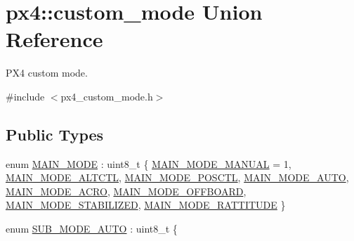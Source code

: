 \hypertarget{unionpx4_1_1custom__mode}{}\section{px4\+::custom\+\_\+mode Union Reference}
\label{unionpx4_1_1custom__mode}


P\+X4 custom mode.  




{\ttfamily \#include $<$px4\+\_\+custom\+\_\+mode.\+h$>$}

\subsection*{Public Types}
\begin{DoxyCompactItemize}
\item 
enum \mbox{\hyperlink{unionpx4_1_1custom__mode_ad9d2a8e78d275f102f16fa30fd46bc82}{M\+A\+I\+N\+\_\+\+M\+O\+DE}} \+: uint8\+\_\+t \{ \newline
\mbox{\hyperlink{unionpx4_1_1custom__mode_ad9d2a8e78d275f102f16fa30fd46bc82a859877541f02ff75c660f1f9ab05ade0}{M\+A\+I\+N\+\_\+\+M\+O\+D\+E\+\_\+\+M\+A\+N\+U\+AL}} = 1, 
\mbox{\hyperlink{unionpx4_1_1custom__mode_ad9d2a8e78d275f102f16fa30fd46bc82a86efb118ff5224cdabe493767f2256dc}{M\+A\+I\+N\+\_\+\+M\+O\+D\+E\+\_\+\+A\+L\+T\+C\+TL}}, 
\mbox{\hyperlink{unionpx4_1_1custom__mode_ad9d2a8e78d275f102f16fa30fd46bc82a1e95a007c4fd63a63a393970223747cd}{M\+A\+I\+N\+\_\+\+M\+O\+D\+E\+\_\+\+P\+O\+S\+C\+TL}}, 
\mbox{\hyperlink{unionpx4_1_1custom__mode_ad9d2a8e78d275f102f16fa30fd46bc82aff2049d1f4a5e0a01add3681c27986a0}{M\+A\+I\+N\+\_\+\+M\+O\+D\+E\+\_\+\+A\+U\+TO}}, 
\newline
\mbox{\hyperlink{unionpx4_1_1custom__mode_ad9d2a8e78d275f102f16fa30fd46bc82a7506d3ca132ad236dec8942e638a7336}{M\+A\+I\+N\+\_\+\+M\+O\+D\+E\+\_\+\+A\+C\+RO}}, 
\mbox{\hyperlink{unionpx4_1_1custom__mode_ad9d2a8e78d275f102f16fa30fd46bc82af4a0491cd9ec75832d350e1925c8992c}{M\+A\+I\+N\+\_\+\+M\+O\+D\+E\+\_\+\+O\+F\+F\+B\+O\+A\+RD}}, 
\mbox{\hyperlink{unionpx4_1_1custom__mode_ad9d2a8e78d275f102f16fa30fd46bc82a4b8b7be9d26f575a78a0eb8d890a9881}{M\+A\+I\+N\+\_\+\+M\+O\+D\+E\+\_\+\+S\+T\+A\+B\+I\+L\+I\+Z\+ED}}, 
\mbox{\hyperlink{unionpx4_1_1custom__mode_ad9d2a8e78d275f102f16fa30fd46bc82a76c02bf5d821b9ffc39471477d021da4}{M\+A\+I\+N\+\_\+\+M\+O\+D\+E\+\_\+\+R\+A\+T\+T\+I\+T\+U\+DE}}
 \}
\item 
enum \mbox{\hyperlink{unionpx4_1_1custom__mode_af4b9497eeaa602d1677ab9f2c2b16931}{S\+U\+B\+\_\+\+M\+O\+D\+E\+\_\+\+A\+U\+TO}} \+: uint8\+\_\+t \{ \newline

\end{DoxyCompactItemize}
